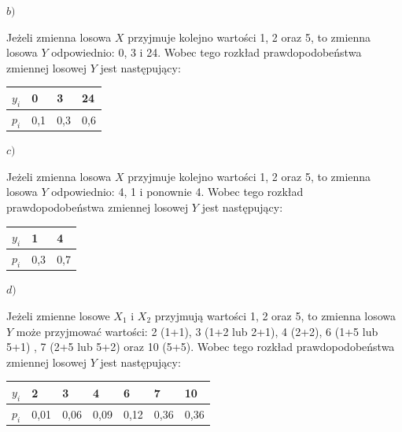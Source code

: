 \documentclass[
  letterpaper,
  DIV=11,
  numbers=noendperiod]{scrreprt}
\begin{document}
\(b)\)

Jeżeli zmienna losowa \(X\) przyjmuje kolejno wartości 1, 2 oraz 5, to
zmienna losowa \(Y\) odpowiednio: 0, 3 i 24. Wobec tego rozkład
prawdopodobeństwa zmiennej losowej \(Y\) jest następujący:

\begin{longtable}[]{@{}llll@{}}
\toprule\noalign{}
\(y_i\) & 0 & 3 & 24 \\
\midrule\noalign{}
\endhead
\bottomrule\noalign{}
\endlastfoot
\(p_i\) & 0,1 & 0,3 & 0,6 \\
\end{longtable}

\(c)\)

Jeżeli zmienna losowa \(X\) przyjmuje kolejno wartości 1, 2 oraz 5, to
zmienna losowa \(Y\) odpowiednio: 4, 1 i ponownie 4. Wobec tego rozkład
prawdopodobeństwa zmiennej losowej \(Y\) jest następujący:

\begin{longtable}[]{@{}lll@{}}
\toprule\noalign{}
\(y_i\) & 1 & 4 \\
\midrule\noalign{}
\endhead
\bottomrule\noalign{}
\endlastfoot
\(p_i\) & 0,3 & 0,7 \\
\end{longtable}

\(d)\)

Jeżeli zmienne losowe \(X_1\) i \(X_2\) przyjmują wartości 1, 2 oraz 5,
to zmienna losowa \(Y\) może przyjmować wartości: 2 (1+1), 3 (1+2 lub
2+1), 4 (2+2), 6 (1+5 lub 5+1) , 7 (2+5 lub 5+2) oraz 10 (5+5). Wobec
tego rozkład prawdopodobeństwa zmiennej losowej \(Y\) jest następujący:

\begin{longtable}[]{@{}lllllll@{}}
\toprule\noalign{}
\(y_i\) & 2 & 3 & 4 & 6 & 7 & 10 \\
\midrule\noalign{}
\endhead
\bottomrule\noalign{}
\endlastfoot
\(p_i\) & 0,01 & 0,06 & 0,09 & 0,12 & 0,36 & 0,36 \\
\end{longtable}

\begin{tcolorbox}[enhanced jigsaw, toprule=.15mm, title={***}, breakable, coltitle=black, titlerule=0mm, colbacktitle=quarto-callout-tip-color!10!white, opacitybacktitle=0.6, opacityback=0, bottomtitle=1mm, left=2mm, arc=.35mm, leftrule=.75mm, bottomrule=.15mm, rightrule=.15mm, toptitle=1mm, colframe=quarto-callout-tip-color-frame, colback=white]

\end{tcolorbox}
\end{document}
